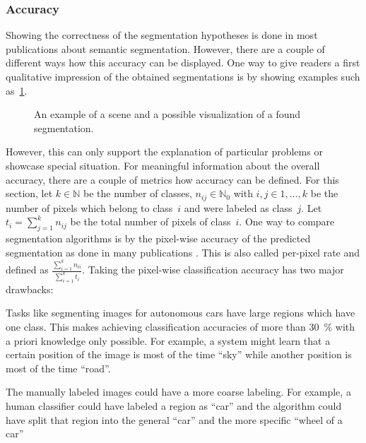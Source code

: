 \documentclass[technote,a4paper,leqno]{IEEEtran}
\begin{document}
\subsubsection{Accuracy}
Showing the correctness of the segmentation hypotheses is done in most
publications about semantic segmentation. However, there are a couple of
different ways how this accuracy can be displayed. One way to give readers a
first qualitative impression of the obtained segmentations is by showing
examples such as~\cref{fig:segmentation-example}.
\begin{figure}
\centering
{}%
\caption{An example of a scene and a possible visualization of a found segmentation.}
\label{fig:segmentation-example}
\end{figure}
However, this can only support the explanation of particular problems or
showcase special situation. For meaningful information about the overall
accuracy, there are a couple of metrics how accuracy can be defined.
For this section, let $k \in \mathbb{N}$ be the number of classes, $n_{ij} \in
\mathbb{N}_0$ with $i,j \in 1, \dots, k$ be the number of pixels which belong to
class~$i$ and were labeled as class~$j$. Let $t_i = \sum_{j=1}^k n_{ij}$ be the
total number of pixels of class~$i$.
One way to compare segmentation algorithms is by the pixel-wise accuracy of the
predicted segmentation as done in many publications
\cite{shotton2006textonboost,csurka2008simple,long2014fully}. This is also
called per-pixel rate and defined as $\frac{\sum_{i=1}^k n_{ii}}{\sum_{i=1}^k
t_i}$. Taking the pixel-wise classification accuracy has two major drawbacks:
\begin{problemnr}
    \item \label{item:problem-large-regions} Tasks like segmenting images for
          autonomous cars have large regions which have one class. This makes
          achieving classification accuracies of more than \SI{30}{\percent}
          with a priori knowledge only possible. For example, a system might
          learn that a certain position of the image is most of the time
          \enquote{sky} while another position is most of the time
          \enquote{road}.
    \item \label{item:problem-labeling-granularity} The manually labeled images
          could have a more coarse labeling. For example, a human classifier
          could have labeled a region as
          \enquote{car} and the algorithm could have split that region into
          the general \enquote{car} and the more specific \enquote{wheel of a
          car}
\end{problemnr}
\end{document}
